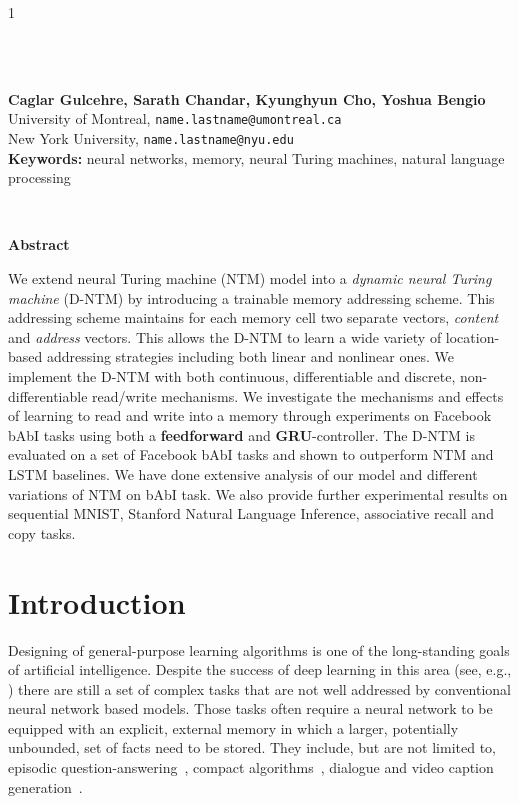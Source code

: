 \documentclass[12pt]{article}
\begin{document}
\hspace{13.9cm}1

\ \vspace{20mm}\\


\ \\
{\bf \large Caglar Gulcehre, Sarath Chandar, Kyunghyun Cho, Yoshua Bengio}\\
{University of Montreal, {\small \tt name.lastname@umontreal.ca}}\\
{New York University, {\small \tt name.lastname@nyu.edu}}\\


{\bf Keywords:} neural networks, memory, neural Turing machines, natural language processing

\thispagestyle{empty}
\ \vspace{-0mm}\\
\begin{center} {\bf Abstract} \end{center}
We extend neural Turing machine (NTM) model into a {\it
    dynamic neural Turing machine} (D-NTM) by introducing a trainable memory
    addressing scheme. This addressing scheme maintains for each memory cell two separate
    vectors, {\it content} and {\it address} vectors. This allows the D-NTM to
    learn a wide variety of location-based addressing strategies including both
    linear and nonlinear ones. We implement the D-NTM with both continuous,
    differentiable and discrete, non-differentiable read/write mechanisms. We investigate
    the mechanisms and effects of learning to read and  write into a memory through experiments 
    on Facebook bAbI tasks using both a {\bf feedforward} and {\bf GRU}-controller. The D-NTM
    is evaluated on a set of Facebook bAbI tasks and shown to outperform NTM and LSTM baselines.
    We have done extensive analysis of our model and different variations of NTM on bAbI task.
    We also provide further experimental results on sequential MNIST, Stanford Natural 
    Language Inference, associative recall and copy tasks.


\section{Introduction}

Designing of general-purpose learning algorithms is one of the long-standing goals
of artificial intelligence. Despite the success of deep learning in this area
(see, e.g., \citep{Goodfellow-et-al-2016-Book}) there are still a set of complex tasks
that are not well addressed by conventional neural network based models. Those tasks often
require a neural network to be equipped with an explicit, external memory in
which a larger, potentially unbounded, set of facts need to be stored. They
include, but are not limited to, episodic question-answering~\citep{weston2014memory,hermann2015teaching,hill2015goldilocks}, compact algorithms~\citep{zaremba2015learning}, dialogue \citep{serban2016building,vinyals2015neural} and video caption generation~\citep{yao2015capgenvid}.
\end{document}
